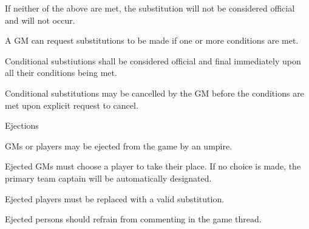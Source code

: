 \begin{deepEnumerate}
\begin{deepEnumerate}
\begin{deepEnumerate}
			\item If neither of the above are met, the substitution will not be considered official and will not occur.
			\item A GM can request substitutions to be made if one or more conditions are met.
			\begin{deepEnumerate}
				\item Conditional substiutions shall be considered official and final immediately upon all their conditions being met. 
				\item Conditional substitutions may be cancelled by the GM before the conditions are met upon explicit request to cancel.
			\end{deepEnumerate}
		\end{deepEnumerate}
	\end{deepEnumerate}
	\item Ejections
	\begin{deepEnumerate}
		\item GMs or players may be ejected from the game by an umpire.
		\begin{deepEnumerate}
			\item Ejected GMs must choose a player to take their place. If no choice is made, the primary team captain will be automatically designated.
			\item Ejected players must be replaced with a valid substitution.
			\item Ejected persons should refrain from commenting in the game thread.
		\end{deepEnumerate}
	\end{deepEnumerate}
\end{deepEnumerate}
